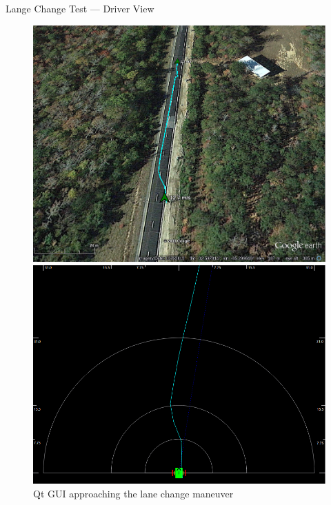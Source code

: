 \documentclass{beamer}
\begin{document}
    \begin{frame}{Lange Change Test --- Driver View}
      \begin{figure}[ht] \centering
        \begin{minipage}[b]{0.45\linewidth} \centering 
          \includegraphics[width=\textwidth]{../graphics/lane_change.png}
          \caption{Google Earth GUI approaching the lane change maneuver}
        \end{minipage}
        \hspace{0.5cm}
        \begin{minipage}[b]{0.45\linewidth} \centering
          \includegraphics[width=\textwidth]{../graphics/lane_change_mono.png} 
          \caption{Qt GUI approaching the lane change maneuver}
        \end{minipage}
      \end{figure}
    \end{frame}
\end{document}
